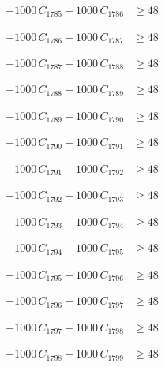 \documentclass[a4paper,11pt]{article}
\begin{document}
\begin{align}
-1000\,C_{1785} + 1000\,C_{1786} &\geq 48 \nonumber
\end{align}

\begin{align}
-1000\,C_{1786} + 1000\,C_{1787} &\geq 48 \nonumber
\end{align}

\begin{align}
-1000\,C_{1787} + 1000\,C_{1788} &\geq 48 \nonumber
\end{align}

\begin{align}
-1000\,C_{1788} + 1000\,C_{1789} &\geq 48 \nonumber
\end{align}

\begin{align}
-1000\,C_{1789} + 1000\,C_{1790} &\geq 48 \nonumber
\end{align}

\begin{align}
-1000\,C_{1790} + 1000\,C_{1791} &\geq 48 \nonumber
\end{align}

\begin{align}
-1000\,C_{1791} + 1000\,C_{1792} &\geq 48 \nonumber
\end{align}

\begin{align}
-1000\,C_{1792} + 1000\,C_{1793} &\geq 48 \nonumber
\end{align}

\begin{align}
-1000\,C_{1793} + 1000\,C_{1794} &\geq 48 \nonumber
\end{align}

\begin{align}
-1000\,C_{1794} + 1000\,C_{1795} &\geq 48 \nonumber
\end{align}

\begin{align}
-1000\,C_{1795} + 1000\,C_{1796} &\geq 48 \nonumber
\end{align}

\begin{align}
-1000\,C_{1796} + 1000\,C_{1797} &\geq 48 \nonumber
\end{align}

\begin{align}
-1000\,C_{1797} + 1000\,C_{1798} &\geq 48 \nonumber
\end{align}

\begin{align}
-1000\,C_{1798} + 1000\,C_{1799} &\geq 48 \nonumber
\end{align}
\end{document}

